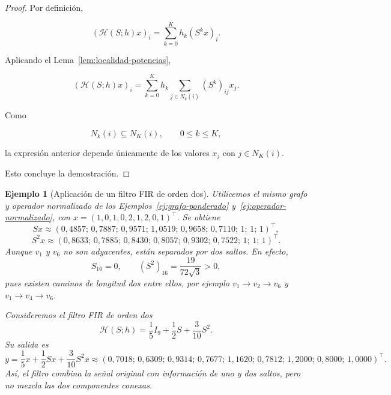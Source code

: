 \documentclass[a4paper,openany,oneside,10pt]{report}
\theoremstyle{pnlTeorema}
\theoremstyle{pnlDefinicion}
\theoremstyle{pnlObservacion}
\newtheorem{ejemplo}{Ejemplo}[section]
\begin{document}
\begin{proof} Por definición,

\[
(\mathcal H(S;h)x)_i
=\sum_{k=0}^{K}h_k(S^kx)_i.
\]

Aplicando el Lema~\ref{lem:localidad-potencias},

\[
(\mathcal H(S;h)x)_i
=\sum_{k=0}^{K}h_k
\sum_{j\in N_k(i)}(S^k)_{ij}x_j.
\]

Como

\[
N_k(i)\subseteq N_K(i),
\qquad 0\le k\le K,
\]

la expresión anterior depende únicamente de los valores \(x_j\) con \(j\in N_K(i)\).

Esto concluye la demostración. 
\end{proof}


\begin{ejemplo}[Aplicación de un filtro FIR de orden dos]\label{ej:filtro-fir}
Utilicemos el mismo grafo y operador normalizado de los Ejemplos~\ref{ej:grafo-ponderado} y~\ref{ej:operador-normalizado}, con \(x=(1,0,1,0,2,1,2,0,1)^\top\). Se obtiene
\[
Sx\approx(0{,}4857;\,0{,}7887;\,0{,}9571;\,1{,}0519;\,0{,}9658;\,0{,}7110;\,1;\,1;\,1)^\top,
\]
\[
S^2x\approx(0{,}8633;\,0{,}7885;\,0{,}8430;\,0{,}8057;\,0{,}9302;\,0{,}7522;\,1;\,1;\,1)^\top.
\]
Aunque \(v_1\) y \(v_6\) no son adyacentes, están separados por dos saltos. En efecto,
\[
S_{16}=0,\qquad (S^2)_{16}=\frac{19}{72\sqrt3}>0,
\]
pues existen caminos de longitud dos entre ellos, por ejemplo \(v_1\to v_2\to v_6\) y \(v_1\to v_4\to v_6\).

Consideremos el filtro FIR de orden dos
\[
\mathcal H(S;h)=\frac15I_9+\frac12S+\frac3{10}S^2.
\]
Su salida es
\[
y=\frac15x+\frac12Sx+\frac3{10}S^2x\approx(0{,}7018;\,0{,}6309;\,0{,}9314;\,0{,}7677;\,1{,}1620;\,0{,}7812;\,1{,}2000;\,0{,}8000;\,1{,}0000)^\top.
\]
Así, el filtro combina la señal original con información de uno y dos saltos, pero no mezcla las dos componentes conexas.
\end{ejemplo}
\end{document}
